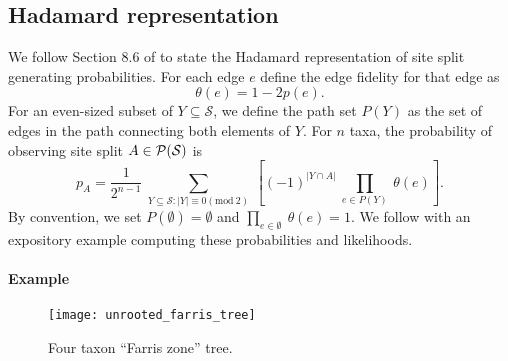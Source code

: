 \subsection*{Hadamard representation}

We follow Section 8.6 of \cite{Semple2003-em} to state the Hadamard representation of site split generating probabilities.
For each edge $e$ define the edge fidelity for that edge as
$$
\theta(e) = 1-2p(e).
$$
For an even-sized subset of $Y\subseteq\mathcal{S}$, we define the path set $P(Y)$ as the set of edges in the path connecting both elements of $Y$.
For $n$ taxa, the probability of observing site split $A\in\mathcal{P}(\mathcal{S})$ is
\begin{equation}
\label{eq:hadamard_probability}
p_A = \frac{1}{2^{n-1}} \ \sum_{Y \subseteq \mathcal{S} : |Y| \equiv 0 (\mathrm{mod} \ 2)} \ \left[(-1)^{|Y \cap A|} \ \prod_{e\in P(Y)} \ \theta(e) \right].
\end{equation}
By convention, we set $P(\emptyset)=\emptyset$ and $\prod_{e\in\emptyset} \ \theta(e) = 1$.
We follow with an expository example computing these probabilities and likelihoods.

\paragraph{Example}
\begin{figure}
    \centering
    \texttt{[image: unrooted\_farris\_tree]}
    \caption{Four taxon ``Farris zone'' tree.}
\label{fig:four-taxa-tree}
\end{figure}

